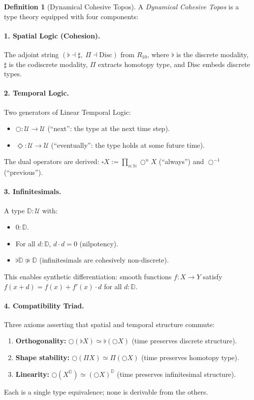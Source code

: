\documentclass[11pt,a4paper]{article}
\theoremstyle{plain}
\theoremstyle{definition}
\newtheorem{definition}[theorem]{Definition}
\theoremstyle{remark}
\newcommand{\N}{\mathbb{N}}
\newcommand{\D}{\mathbb{D}}
\newcommand{\U}{\mathcal{U}}
\newcommand{\Disc}{\mathrm{Disc}}
\begin{document}
\begin{definition}[Dynamical Cohesive Topos]
\label{def:dct}
A \emph{Dynamical Cohesive Topos} is a type theory equipped with four components:

\paragraph{1. Spatial Logic (Cohesion).}
The adjoint string $(\flat \dashv \sharp,\; \Pi \dashv \Disc)$ from $R_{10}$, where $\flat$ is the discrete modality, $\sharp$ is the codiscrete modality, $\Pi$ extracts homotopy type, and $\Disc$ embeds discrete types.

\paragraph{2. Temporal Logic.}
Two generators of Linear Temporal Logic:
\begin{itemize}[nosep]
    \item $\bigcirc : \U \to \U$ (``next'': the type at the next time step).
    \item $\Diamond : \U \to \U$ (``eventually'': the type holds at some future time).
\end{itemize}
The dual operators are derived: $\square X := \prod_{n:\N} \bigcirc^n X$ (``always'') and $\bigcirc^{-1}$ (``previous'').

\paragraph{3. Infinitesimals.}
A type $\D : \U$ with:
\begin{itemize}[nosep]
    \item $0 : \D$.
    \item For all $d : \D$, $d \cdot d = 0$ (nilpotency).
    \item $\flat\D \not\simeq \D$ (infinitesimals are cohesively non-discrete).
\end{itemize}
This enables synthetic differentiation: smooth functions $f : X \to Y$ satisfy $f(x + d) = f(x) + f'(x) \cdot d$ for all $d : \D$.

\paragraph{4. Compatibility Triad.}
Three axioms asserting that spatial and temporal structure commute:
\begin{enumerate}[label=\textbf{(C\arabic*)}, nosep]
    \item \textbf{Orthogonality:} $\bigcirc(\flat X) \simeq \flat(\bigcirc X)$
    \hfill (time preserves discrete structure).
    \item \textbf{Shape stability:} $\bigcirc(\Pi X) \simeq \Pi(\bigcirc X)$
    \hfill (time preserves homotopy type).
    \item \textbf{Linearity:} $\bigcirc(X^{\D}) \simeq (\bigcirc X)^{\D}$
    \hfill (time preserves infinitesimal structure).
\end{enumerate}
Each is a single type equivalence; none is derivable from the others.
\end{definition}
\end{document}
